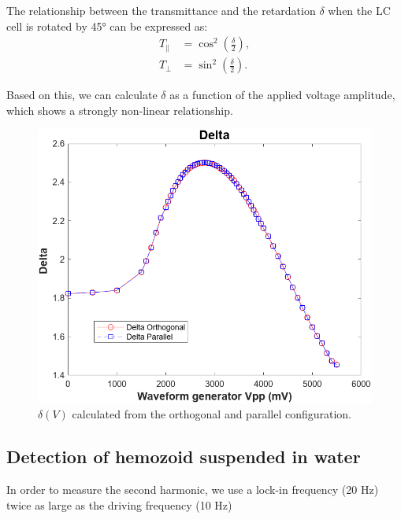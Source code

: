 \documentclass[12pt,a4paper]{article}
\begin{document}

The relationship between the transmittance and the retardation $\delta$ when the LC cell is rotated by 45° can be expressed as:
\begin{align*}
T_\parallel &= \cos^2\!\left(\frac{\delta}{2}\right),\\
T_\perp      &= \sin^2\!\left(\frac{\delta}{2}\right).
\end{align*}

Based on this, we can calculate $\delta$ as a function of the applied voltage amplitude, which shows a strongly non-linear relationship.

\begin{figure} [H]
    \centering
    \includegraphics[width=0.6\linewidth]{figs/task34_delta.png}
    \caption{$\delta(V)$ calculated from the orthogonal and parallel configuration.}
    \label{fig:t3_4_delta}
\end{figure}

\subsection{Detection of hemozoid suspended in water}


In order to measure the second harmonic, we use a lock-in frequency (20 Hz) twice as large as the driving frequency (10 Hz)

\end{document}

